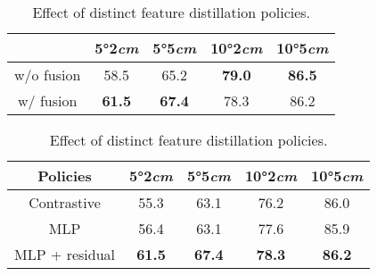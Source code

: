 \begin{table}[htbp]
     \vspace{0.2cm}  %

    \begin{subtable}[t]{1.0\linewidth}  %
        \centering
        \setlength\tabcolsep{9pt}%
        \begin{tabular}{c|cccc}
            \toprule
            ~ & 5°2\emph{cm} & 5°5\emph{cm} & 10°2\emph{cm}  & 10°5\emph{cm}\\
            \midrule
            w/o fusion  & 58.5          &65.2    &\textbf{79.0} &\textbf{86.5}   \\
            \rowcolor{mygray}
            w/ fusion & \textbf{61.5}          &\textbf{67.4}    &78.3 &86.2    \\
            \bottomrule
        \end{tabular}
        \caption{Effect of adaptive weight fusion in front-door adjustment.}
        \label{tab:ab_causal_fusion}
    \end{subtable}

    \vspace{0.2cm}  %
    
    \begin{subtable}[t]{1.0\linewidth}  %
        \centering
        \setlength\tabcolsep{7.5pt}%
        \begin{tabular}{c|cccc}
            \toprule
            Policies & 5°2\emph{cm} & 5°5\emph{cm} & 10°2\emph{cm}  & 10°5\emph{cm}\\
            \midrule
            Contrastive  & 55.3          &63.1    &76.2 &86.0   \\
            MLP & 56.4          &63.1    &77.6 &85.9   \\
            \rowcolor{mygray}
            MLP + residual & \textbf{61.5}          &\textbf{67.4}    &\textbf{78.3} &\textbf{86.2}   \\
            \bottomrule
        \end{tabular}
        \caption{Effect of distinct feature distillation policies.}
        \label{tab:ab_dis_layer}
    \end{subtable}

    \vspace{0.2cm}  %


\end{table}
